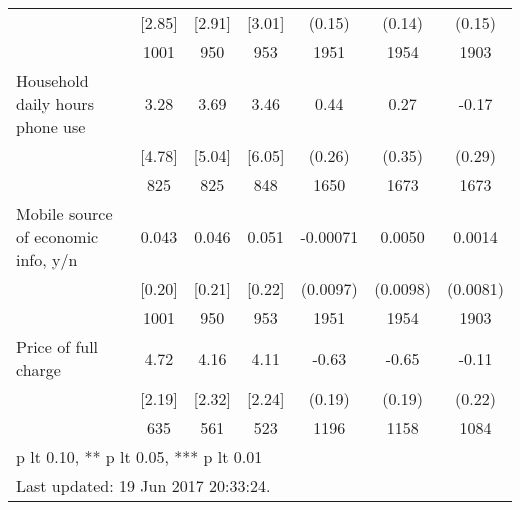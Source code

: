 \begin{table}[htbp]
\begin{tabular*}{1\hsize}{@{\hskip\tabcolsep\extracolsep\fill}l*{1}{cccccc}}
                                &   [2.85]&   [2.91]&   [3.01]&   (0.15)         &   (0.14)         &   (0.15)         \\
                                &     1001&      950&      953&     1951         &     1954         &     1903         \\
Household daily hours phone use &     3.28&     3.69&     3.46&     0.44\sym{*}  &     0.27         &    -0.17         \\
                                &   [4.78]&   [5.04]&   [6.05]&   (0.26)         &   (0.35)         &   (0.29)         \\
                                &      825&      825&      848&     1650         &     1673         &     1673         \\
Mobile source of economic info, y/n&    0.043&    0.046&    0.051& -0.00071         &   0.0050         &   0.0014         \\
                                &   [0.20]&   [0.21]&   [0.22]& (0.0097)         & (0.0098)         & (0.0081)         \\
                                &     1001&      950&      953&     1951         &     1954         &     1903         \\
Price of full charge            &     4.72&     4.16&     4.11&    -0.63\sym{***}&    -0.65\sym{***}&    -0.11         \\
                                &   [2.19]&   [2.32]&   [2.24]&   (0.19)         &   (0.19)         &   (0.22)         \\
                                &      635&      561&      523&     1196         &     1158         &     1084         \\
\bottomrule
\multicolumn{7}{l}{\footnotesize * p lt 0.10, ** p lt 0.05, *** p lt 0.01}\\
\multicolumn{7}{l}{\footnotesize Last updated: 19 Jun 2017 20:33:24.}\\
\end{tabular*}
\end{table}
